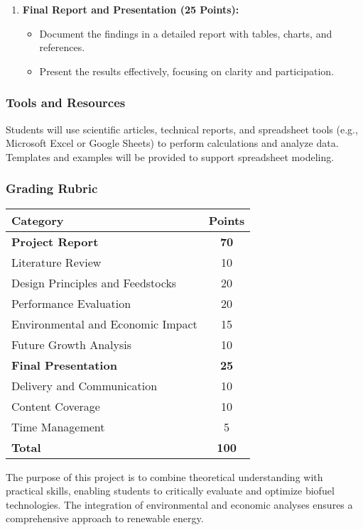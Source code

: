\documentclass[11pt]{article}
\begin{document}
\begin{enumerate}
    \item \textbf{Final Report and Presentation (25 Points):}
    \begin{itemize}
        \item Document the findings in a detailed report with tables, charts, and references.
        \item Present the results effectively, focusing on clarity and participation.
    \end{itemize}
\end{enumerate}

\subsubsection*{Tools and Resources}
Students will use scientific articles, technical reports, and spreadsheet tools (e.g., Microsoft Excel or Google Sheets) to perform calculations and analyze data. Templates and examples will be provided to support spreadsheet modeling.

\subsubsection*{Grading Rubric}
\begin{center}
\begin{tabular}{|l|c|}
\hline
\textbf{Category} & \textbf{Points} \\
\hline
\textbf{Project Report} & \textbf{70} \\
Literature Review & 10 \\
Design Principles and Feedstocks & 20 \\
Performance Evaluation & 20 \\
Environmental and Economic Impact & 15 \\
Future Growth Analysis & 10 \\
 \hline
        \textbf{Final Presentation} & \textbf{25} \\
        Delivery and Communication & 10 \\
        Content Coverage & 10 \\
        Time Management & 5 \\
        \hline
\hline
\textbf{Total} & \textbf{100} \\
\hline
\end{tabular}
\end{center}

The purpose of this project is to combine theoretical understanding with practical skills, enabling students to critically evaluate and optimize biofuel technologies. The integration of environmental and economic analyses ensures a comprehensive approach to renewable energy.
\newpage
\end{document}
